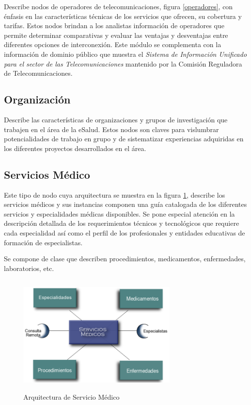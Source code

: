 Describe nodos de operadores de telecomunicaciones, figura \ref{operadores}, con énfasis en las características técnicas de los servicios que ofrecen, su cobertura y tarifas. Estos nodos brindan a los analistas información de operadores que permite determinar comparativas y evaluar las ventajas y desventajas entre diferentes opciones de interconexión. Este módulo se complementa con la información de dominio público que muestra el \textit{Sistema de Información Unificado para el sector de las Telecomunicaciones} mantenido por la Comisión Reguladora de Telecomunicaciones.

\subsection{Organización} 

Describe las características de organizaciones y grupos de investigación que trabajen en el área de la eSalud.  Estos nodos son claves para vislumbrar potencialidades de trabajo en grupo y de sistematizar experiencias adquiridas en los diferentes proyectos desarrollados en el área. 

\subsection{Servicios Médico} 
Este tipo de nodo cuya arquitectura se muestra en la figura \ref{servicios}, describe los servicios médicos y sus instancias componen una guía catalogada de los diferentes servicios y especialidades médicas disponibles. Se pone especial atención en la descripción detallada de los requerimientos técnicos y tecnológicos que requiere cada especialidad así como el perfil de los profesionales y entidades educativas de formación de especialistas. 

Se compone de clase que describen procedimientos, medicamentos, enfermedades, laboratorios, etc. 

\begin{figure}
 \centering
 \includegraphics[width=80mm, height=60mm]{servicios.png}
 \caption{Arquitectura de Servicio Médico}
 \label{servicios}
\end{figure}

